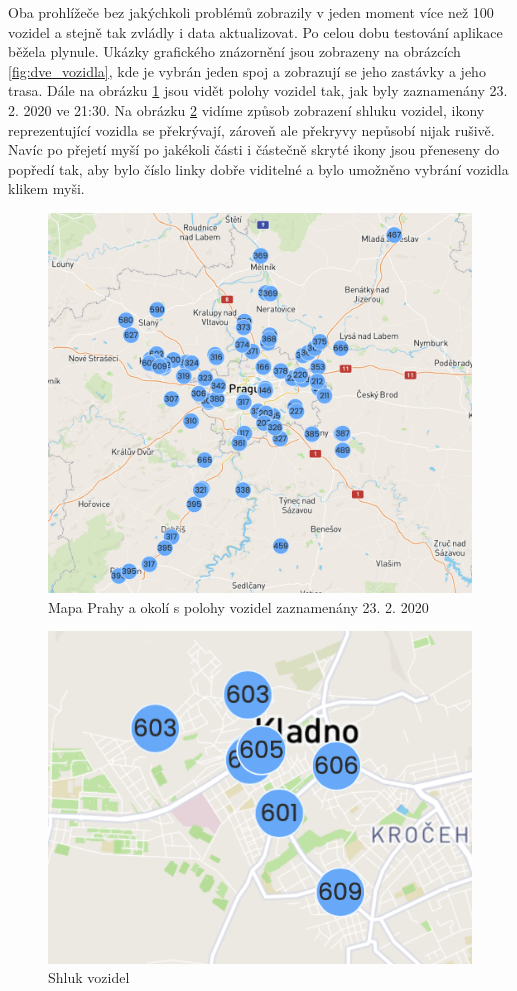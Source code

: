 \bigbreak


Oba prohlížeče bez jakýchkoli problémů zobrazily v jeden moment více než 100 vozidel a stejně tak zvládly i data aktualizovat. Po celou dobu testování aplikace běžela plynule. Ukázky grafického znázornění jsou zobrazeny na obrázcích \ref{fig:dve_vozidla}, kde je vybrán jeden spoj a zobrazují se jeho zastávky a jeho trasa. Dále na obrázku \ref{fig:big_picture} jsou vidět polohy vozidel tak, jak byly zaznamenány 23. 2. 2020 ve 21:30. Na obrázku \ref{fig:cluster} vidíme způsob zobrazení shluku vozidel, ikony reprezentující vozidla se překrývají, zároveň ale překryvy nepůsobí nijak rušivě. Navíc po přejetí myší po jakékoli části i částečně skryté ikony jsou přeneseny do popředí tak, aby bylo číslo linky dobře viditelné a bylo umožněno vybrání vozidla klikem myši.


\begin{figure}
   \centering
 \includegraphics[width=0.7\linewidth]{../img/big_picture.png}
 \caption{Mapa Prahy a okolí s polohy vozidel zaznamenány 23. 2. 2020}
 \label{fig:big_picture}
\end{figure}


\begin{figure}
   \centering
 \includegraphics[width=0.3\linewidth]{../img/cluster.png}
 \caption{Shluk vozidel}
 \label{fig:cluster}
\end{figure}




